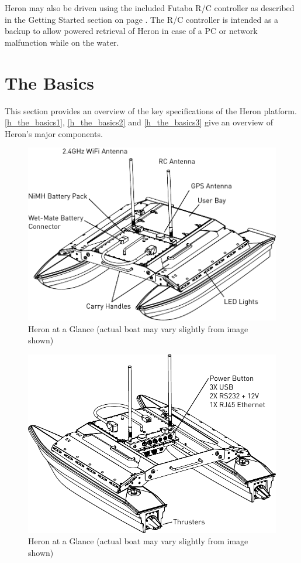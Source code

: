 \documentclass[]{clearpath-latex/clearpath-manual}
\begin{document}
Heron may also be driven using the included Futaba R/C controller as described in the Getting Started section on page \pageref{gettingstarted}. The R/C controller is intended as a backup to allow powered retrieval of Heron in case of a PC or network malfunction while on the water.

\section{The Basics}
This section provides an overview of the key specifications of the Heron platform. \autoref{h_the_basics1}, \autoref{h_the_basics2} and \autoref{h_the_basics3} give an overview of Heron's major components.

\begin{figure}[h]
  \centering  \includegraphics[width=0.75\linewidth]{graphics/basics_1.pdf}
  \caption{Heron at a Glance (actual boat may vary slightly from image shown)}
  \label{h_the_basics1}
\end{figure}

\begin{figure}[h]
  \centering  \includegraphics[width=0.75\linewidth]{graphics/basics_2.pdf}
  \caption{Heron at a Glance (actual boat may vary slightly from image shown)}
  \label{h_the_basics2}
\end{figure}
\end{document}
